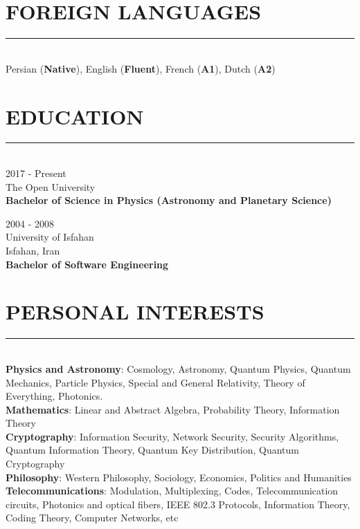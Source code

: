 \documentclass[10pt,a4paper]{article}
\begin{document}
\section{FOREIGN LANGUAGES}
\noindent \rule {18.0cm}{0.2pt} \\
    Persian (\textbf{Native}), English (\textbf{Fluent}), French (\textbf{A1}), Dutch (\textbf{A2}) \\

\section{EDUCATION}
\noindent \rule {18.0cm}{0.2pt} \\
\textbullet \hspace{0.1cm} 2017 - Present \\
The Open University \\
\textbf{Bachelor of Science in Physics (Astronomy and Planetary Science)}
\vspace{0.3cm}

\noindent \textbullet \hspace{0.1cm}  2004 - 2008 \\
University of Isfahan \\
Isfahan, Iran \\
\textbf{Bachelor of Software Engineering}


\section{PERSONAL INTERESTS}
\noindent \rule {18.0cm}{0.2pt} \\
\textbullet \hspace{0.1cm} \textbf{Physics and Astronomy}: Cosmology, Astronomy, Quantum Physics, Quantum Mechanics, Particle Physics, Special and General Relativity, Theory of Everything, Photonics. \\
\textbullet \hspace{0.1cm} \textbf{Mathematics}: Linear and Abstract Algebra, Probability Theory, Information Theory \\
\textbullet \hspace{0.1cm} \textbf{Cryptography}: Information Security, Network Security, Security Algorithms, Quantum Information Theory, Quantum Key Distribution, Quantum Cryptography \\
\textbullet \hspace{0.1cm} \textbf{Philosophy}: Western Philosophy, Sociology, Economics, Politics and Humanities \\
\textbullet \hspace{0.1cm} \textbf{Telecommunications}: Modulation, Multiplexing, Codes, Telecommunication circuits, Photonics and optical fibers, IEEE 802.3 Protocols, Information Theory, Coding Theory, Computer Networks, etc \\
\end{document}
